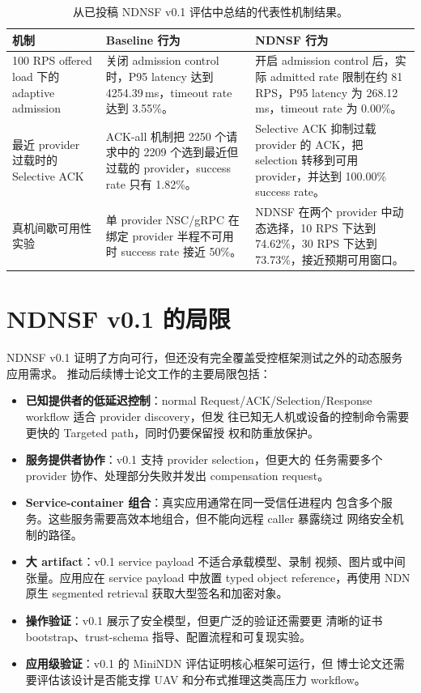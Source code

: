\begin{table}[H]
\centering
\caption{从已投稿 NDNSF v0.1 评估中总结的代表性机制结果。}
\label{tab:ndnsf-v01-mechanisms-ch}
\begin{tabularx}{\textwidth}{p{}p{}X}
\toprule
机制 & Baseline 行为 & NDNSF 行为 \\
\midrule
100 RPS offered load 下的 adaptive admission & 关闭 admission control 时，P95 latency 达到 4254.39\,ms，timeout rate 达到 3.55\%。 & 开启 admission control 后，实际 admitted rate 限制在约 81 RPS，P95 latency 为 268.12\,ms，timeout rate 为 0.00\%。 \\
最近 provider 过载时的 Selective ACK & ACK-all 机制把 2250 个请求中的 2209 个选到最近但过载的 provider，success rate 只有 1.82\%。 & Selective ACK 抑制过载 provider 的 ACK，把 selection 转移到可用 provider，并达到 100.00\% success rate。 \\
真机间歇可用性实验 & 单 provider NSC/gRPC 在绑定 provider 半程不可用时 success rate 接近 50\%。 & NDNSF 在两个 provider 中动态选择，10 RPS 下达到 74.62\%，30 RPS 下达到 73.73\%，接近预期可用窗口。 \\
\bottomrule
\end{tabularx}
\end{table}

\section{NDNSF v0.1 的局限}

NDNSF v0.1 证明了方向可行，但还没有完全覆盖受控框架测试之外的动态服务
应用需求。
推动后续博士论文工作的主要局限包括：

\begin{itemize}
  \item \textbf{已知提供者的低延迟控制}：normal
  Request/ACK/Selection/Response workflow 适合 provider discovery，但发
  往已知无人机或设备的控制命令需要更快的 Targeted path，同时仍要保留授
  权和防重放保护。
  \item \textbf{服务提供者协作}：v0.1 支持 provider selection，但更大的
  任务需要多个 provider 协作、处理部分失败并发出 compensation request。
  \item \textbf{Service-container 组合}：真实应用通常在同一受信任进程内
  包含多个服务。这些服务需要高效本地组合，但不能向远程 caller 暴露绕过
  网络安全机制的路径。
  \item \textbf{大 artifact}：v0.1 service payload 不适合承载模型、录制
  视频、图片或中间张量。应用应在 service payload 中放置 typed object
  reference，再使用 NDN 原生 segmented retrieval 获取大型签名和加密对象。
  \item \textbf{操作验证}：v0.1 展示了安全模型，但更广泛的验证还需要更
  清晰的证书 bootstrap、trust-schema 指导、配置流程和可复现实验。
  \item \textbf{应用级验证}：v0.1 的 MiniNDN 评估证明核心框架可运行，但
  博士论文还需要评估该设计是否能支撑 UAV 和分布式推理这类高压力 workflow。
\end{itemize}

